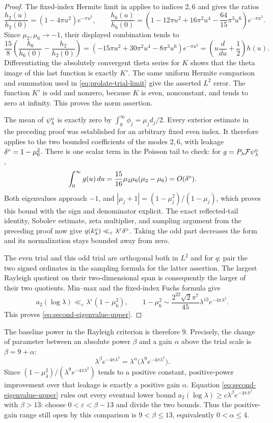 \begin{proof}
The fixed-index Hermite limit in \cite[equation~(7.10), p.~30]{ccm2025}
applies to indices $2,6$ and gives the ratios
\[
 \frac{h_2(u)}{h_2(0)}=(1-4\pi u^2)e^{-\pi u^2},\qquad
 \frac{h_6(u)}{h_6(0)}=
 \left(1-12\pi u^2+16\pi^2u^4-\frac{64}{15}\pi^3u^6\right)
 e^{-\pi u^2}.
\]
Since $\mu_2,\mu_6\to-1$, their displayed combination tends to
\[
 \frac{15}{8}\left(\frac{h_6}{h_6(0)}-\frac{h_2}{h_2(0)}\right)
  =(-15\pi u^2+30\pi^2u^4-8\pi^3u^6)e^{-\pi u^2}
  =\left(u\frac{d}{du}+\frac12\right)h(u).
\]
Differentiating the absolutely convergent theta series for $K$ shows
that the theta image of this last function is exactly $K'$.
The same uniform Hermite comparison and summation used in
\eqref{eq:prolate-trial-limit} give the asserted $L^2$ error.
The function $K'$ is odd and nonzero, because $K$ is even, nonconstant,
and tends to zero at infinity.  This proves the norm assertion.

The mean of $\psi_\lambda^{\rm o}$ is exactly zero by
$\int_0^\infty\phi_j=\mu_jd_j/2$.  Every exterior estimate in the
preceding proof was established for an arbitrary fixed even index.
It therefore applies to the two bounded coefficients of the modes
$2,6$, with leakage $\delta^{\rm o}=1-\mu_6^2$.
There is one scalar term in the Poisson tail to check: for
$g=P_\lambda\mathcal F\psi_\lambda^{\rm o}$,
\[
 \int_0^\infty g(u)\,du
   =\frac{15}{16}\mu_2\mu_6(\mu_2-\mu_6)
   =O(\delta^{\rm o}).
\]
Both eigenvalues approach $-1$, and
$|\mu_j+1|=(1-\mu_j^2)/(1-\mu_j)$, which proves this bound with
the sign and denominator explicit.  The exact reflected-tail
identity, Sobolev estimate, zeta multiplier, and sampling argument
from the preceding proof now give
$q(k_\lambda^{\rm o})\ll_\varepsilon
\lambda^\varepsilon\delta^{\rm o}$.  Taking the odd part decreases
the form and its normalization stays bounded away from zero.

The even trial and this odd trial are orthogonal both in $L^2$ and
for $q$: pair the two signed ordinates in the sampling formula for
the latter assertion.  The largest Rayleigh quotient on their
two-dimensional span is consequently the larger of their two
quotients.  Min--max and the fixed-index Fuchs formula give
\[
 a_2(\log\lambda)\ll_\varepsilon
       \lambda^\varepsilon(1-\mu_6^2),\qquad
 1-\mu_6^2\sim\frac{2^{22}\sqrt2\pi^7}{45}
                          \lambda^{13}e^{-4\pi\lambda^2}.
\]
This proves \eqref{eq:second-eigenvalue-upper}.
\end{proof}

The baseline power in the Rayleigh criterion is therefore $9$.
Precisely, the change of parameter between an absolute power $\beta$
and a gain $\alpha$ above the trial scale is $\beta=9+\alpha$:
\[
 \lambda^\beta e^{-4\pi\lambda^2}
  =\lambda^\alpha\bigl(\lambda^9e^{-4\pi\lambda^2}\bigr).
\]
Since $(1-\mu_4^2)/(\lambda^9e^{-4\pi\lambda^2})$ tends to a
positive constant, positive-power improvement over that leakage is
exactly a positive gain $\alpha$.  Equation
\eqref{eq:second-eigenvalue-upper} rules out every eventual lower
bound $a_2(\log\lambda)\ge c\lambda^\beta e^{-4\pi\lambda^2}$
with $\beta>13$: choose $0<\varepsilon<\beta-13$ and divide the two
bounds.  Thus the positive-gain range still open by this comparison
is $9<\beta\le13$, equivalently $0<\alpha\le4$.
